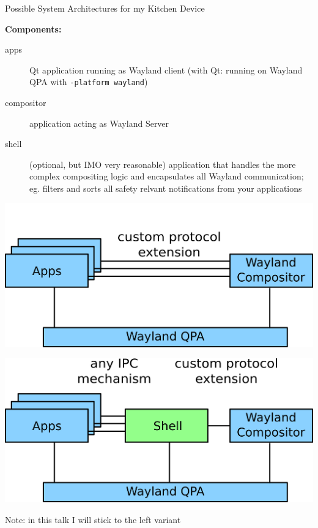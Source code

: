 \documentclass[ucs,9pt]{beamer}
\begin{document}
\begin{frame}
    {Possible System Architectures for my Kitchen Device}

    \textbf{Components:}
    \begin{description}
        \item [apps] Qt application running as Wayland client (with Qt: running on Wayland QPA with {\tt -platform wayland})
        \item [compositor] application acting as Wayland Server
        \item [shell] (optional, but IMO very reasonable) application that handles the more complex compositing logic and encapsulates all Wayland communication; eg. filters and sorts all safety relvant notifications from your applications
    \end{description}
    \medskip

    \begin{multicols}{2}
        \includegraphics[width=\linewidth]{architecture.png}
        \columnbreak

        \includegraphics[width=\linewidth]{architecture-shell.png}
    \end{multicols}

    Note: in this talk I will stick to the left variant
\end{frame}
\end{document}
